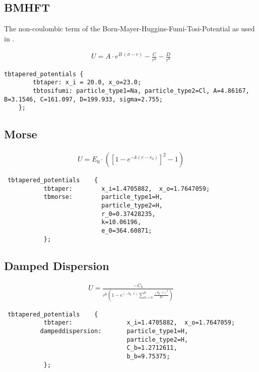 \subsection{BMHFT}
The non-coulombic term of the Born-Mayer-Huggins-Fumi-Tosi-Potential as used in \cite{tosifuminacl}. 

\begin{align*}
    U = A \cdot e^{B\,\left (\sigma-r\right )} - \frac{C}{r^6} - \frac{D}{r^8}
\end{align*}

\begin{lstlisting}[caption={Example taken from  NaCl test case using \texttt{kcalpermole} units.}]
    tbtapered_potentials {
        tbtaper: x_i = 20.0, x_o=23.0;
        tbtosifumi: particle_type1=Na, particle_type2=Cl, A=4.86167, B=3.1546, C=161.097, D=199.933, sigma=2.755;
    };
\end{lstlisting}


\subsection{Morse}
\label{subsec:NonBondMorse}
\begin{align*}
U = E_0 \cdot \left( \left[ 1- e^{-k(r-r_0)} \right]^2-1 \right)
\end{align*}

\begin{lstlisting}
 tbtapered_potentials    {
           tbtaper:        x_i=1.4705882,  x_o=1.7647059;
           tbmorse:        particle_type1=H,
                           particle_type2=H,
                           r_0=0.37428235,
                           k=10.06196,
                           e_0=364.60871;
           };
\end{lstlisting}


\subsection{Damped Dispersion}
\label{subsec:NonBondDampedDsipersion}
\begin{align*}
U = \frac{-C_b}{r^6\left( 1- e^{(-b_b\cdot r)} \sum_{k=0}^6\frac{(b_b\cdot r)^k}{k!} \right)}
\end{align*}
\begin{lstlisting}
 tbtapered_potentials    {
           tbtaper:               x_i=1.4705882,  x_o=1.7647059;
          dampeddispersion:       particle_type1=H,
                                  particle_type2=H,
                                  C_b=1.2712611,
                                  b_b=9.75375;
           };
\end{lstlisting}

